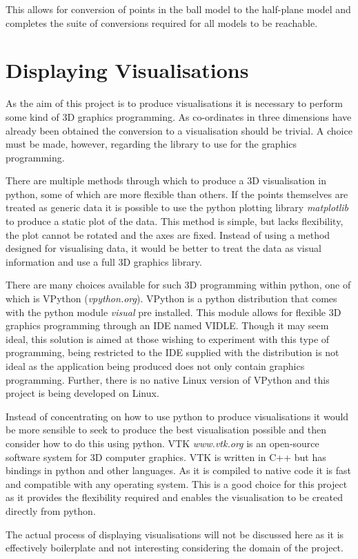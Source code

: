 This allows for conversion of points in the ball model to the half-plane model and completes the suite of conversions required for all models to be reachable.

\section{Displaying Visualisations}
As the aim of this project is to produce visualisations it is necessary to perform some kind of 3D graphics programming. As co-ordinates in three dimensions have already been obtained the conversion to a visualisation should be trivial. A choice must be made, however, regarding the library to use for the graphics programming. 

There are multiple methods through which to produce a 3D visualisation in python, some of which are more flexible than others. If the points themselves are treated as generic data it is possible to use the python plotting library \textit{matplotlib} to produce a static plot of the data. This method is simple, but lacks flexibility, the plot cannot be rotated and the axes are fixed. Instead of using a method designed for visualising data, it would be better to treat the data as visual information and use a full 3D graphics library. 

There are many choices available for such 3D programming within python, one of which is VPython (\textit{vpython.org}). VPython is a python distribution that comes with the python module \textit{visual} pre installed. This module allows for flexible 3D graphics programming through an IDE named VIDLE. Though it may seem ideal, this solution is aimed at those wishing to experiment with this type of programming, being restricted to the IDE supplied with the distribution is not ideal as the application being produced does not only contain graphics programming. Further, there is no native Linux version of VPython and this project is being developed on Linux. 

Instead of concentrating on how to use python to produce visualisations it would be more sensible to seek to produce the best visualisation possible and then consider how to do this using python. VTK \textit{www.vtk.org} is an open-source software system for 3D computer graphics. VTK is written in C++ but has bindings in python and other languages. As it is compiled to native code it is fast and compatible with any operating system. This is a good choice for this project as it provides the flexibility required and enables the visualisation to be created directly from python.

The actual process of displaying visualisations will not be discussed here as it is effectively boilerplate and not interesting considering the domain of the project. 
